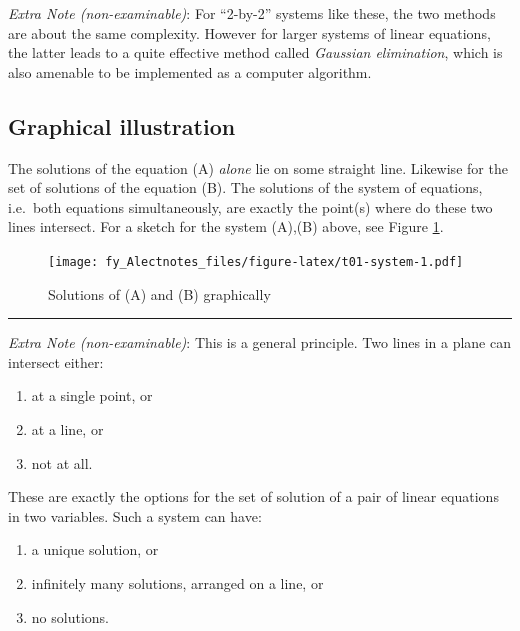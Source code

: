 \documentclass[
  12pt,
  oneside]{book}
\providecommand{\tightlist}{%
  \setlength{\itemsep}{0pt}\setlength{\parskip}{0pt}}
\theoremstyle{definition}
\theoremstyle{definition}
\theoremstyle{definition}
\theoremstyle{definition}
\theoremstyle{remark}
\begin{document}
\emph{Extra Note (non-examinable)}: For ``2-by-2'' systems like these, the two methods are about the same complexity. However for larger systems of linear equations, the latter leads to a quite effective method called \emph{Gaussian elimination}, which is also amenable to be implemented as a computer algorithm.

\hypertarget{graphical-illustration}{%
\subsection{Graphical illustration}\label{graphical-illustration}}

The solutions of the equation (A) \emph{alone} lie on some straight line. Likewise for the set of solutions of the equation (B). The solutions of the system of equations, i.e.~both equations simultaneously, are exactly the point(s) where do these two lines intersect. For a sketch for the system (A),(B) above, see Figure \ref{fig:t01-system}.

\begin{figure}
\centering
\texttt{[image: fy\_Alectnotes\_files/figure-latex/t01-system-1.pdf]}
\caption{\label{fig:t01-system}Solutions of (A) and (B) graphically}
\end{figure}

\begin{center}\rule{0.5\linewidth}{0.5pt}\end{center}

\emph{Extra Note (non-examinable)}: This is a general principle. Two lines in a plane can intersect either:

\begin{enumerate}
\def\labelenumi{\alph{enumi})}
\tightlist
\item
  at a single point, or
\item
  at a line, or
\item
  not at all.
\end{enumerate}

These are exactly the options for the set of solution of a pair of linear equations in two variables. Such a system can have:

\begin{enumerate}
\def\labelenumi{\alph{enumi})}
\tightlist
\item
  a unique solution, or
\item
  infinitely many solutions, arranged on a line, or
\item
  no solutions.
\end{enumerate}
\end{document}
